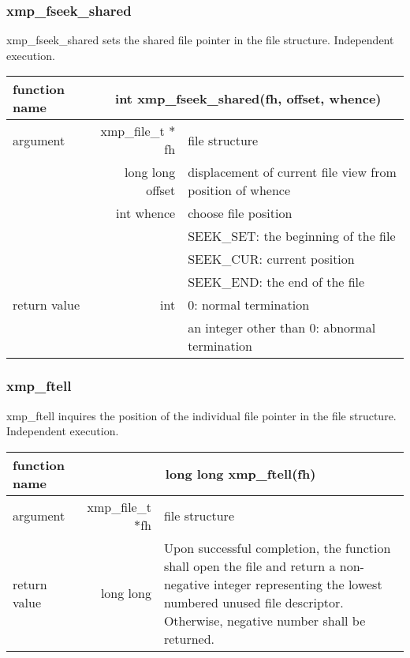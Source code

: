    \subsubsection{xmp\_fseek\_shared}
   xmp\_fseek\_shared sets the shared file pointer in the file structure. Independent execution.

   \begin{table}[h]
    \begin{center}
     \begin{tabular}{|l|r|p{80mm}|}
      \hline
      {\bf function name}  & \multicolumn{2}{c|}{\bf int xmp\_fseek\_shared(fh,
      offset, whence)}  \\ \hline \hline
      argument & xmp\_file\_t $*$fh & file structure \\ \cline{2-3}
      & long long offset & displacement of current file view from
	      position of whence \\ \cline{2-3}
      & int whence & choose file position \\
      &  & SEEK\_SET: the beginning of the file \\ 
      &  & SEEK\_CUR: current position \\ 
      &  & SEEK\_END: the end of the file \\ \hline
      return value & int & 0: normal termination \\
      &  & an integer other than 0: abnormal termination \\ \hline
      \end{tabular}
     \end{center}
    \label{tb:aaa}
   \end{table}

   \subsubsection{xmp\_ftell}
   xmp\_ftell inquires the position of the individual file pointer in the file structure. Independent execution.

   \begin{table}[h]
    \begin{center}
     \begin{tabular}{|l|r|p{80mm}|}
      \hline
      {\bf function name}  & \multicolumn{2}{c|}{\bf long long
      xmp\_ftell(fh)} \\ \hline \hline
      argument & xmp\_file\_t $*$fh & file structure \\ \hline
      return value & long long & Upon successful completion, the
	      function shall open the file and return a non-negative
	      integer representing the lowest numbered unused file
	      descriptor. Otherwise, negative number shall be
	      returned. \\ \hline
      \end{tabular}
     \end{center}
    \label{tb:aaa}
   \end{table}

